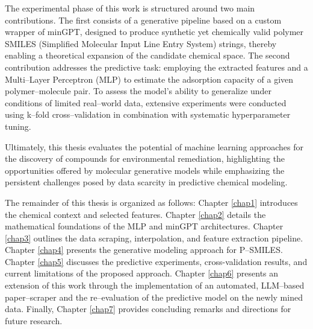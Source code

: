 The experimental phase of this work is structured around two main contributions. The first consists of a generative pipeline based on a custom wrapper of minGPT, designed to produce synthetic yet chemically valid polymer SMILES (Simplified Molecular Input Line Entry System) strings, thereby enabling a theoretical expansion of the candidate chemical space. The second contribution addresses the predictive task: employing the extracted features and a Multi--Layer Perceptron (MLP) to estimate the adsorption capacity of a given polymer--molecule pair. To assess the model’s ability to generalize under conditions of limited real--world data, extensive experiments were conducted using k--fold cross--validation in combination with systematic hyperparameter tuning. 

Ultimately, this thesis evaluates the potential of machine learning approaches for the discovery of compounds for environmental remediation, highlighting the opportunities offered by molecular generative models while emphasizing the persistent challenges posed by data scarcity in predictive chemical modeling.

The remainder of this thesis is organized as follows: Chapter \ref{chap1} introduces the chemical context and selected features. Chapter \ref{chap2} details the mathematical foundations of the MLP and minGPT architectures. Chapter \ref{chap3} outlines the data scraping, interpolation, and feature extraction pipeline. Chapter \ref{chap4} presents the generative modeling approach for P--SMILES. Chapter \ref{chap5} discusses the predictive experiments, cross-validation results, and current limitations of the proposed approach. Chapter \ref{chap6} presents an extension of this work through the implementation of an automated, LLM--based paper--scraper and the re--evaluation of the predictive model on the newly mined data. Finally, Chapter \ref{chap7} provides concluding remarks and directions for future research.
